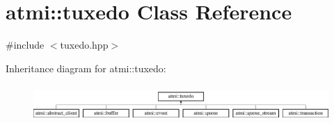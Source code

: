 \hypertarget{classatmi_1_1tuxedo}{\section{atmi\+:\+:tuxedo Class Reference}
\label{classatmi_1_1tuxedo}
}


{\ttfamily \#include $<$tuxedo.\+hpp$>$}

Inheritance diagram for atmi\+:\+:tuxedo\+:\begin{figure}[H]
\begin{center}
\leavevmode
\includegraphics[height=1.435897cm]{classatmi_1_1tuxedo}
\end{center}
\end{figure}
